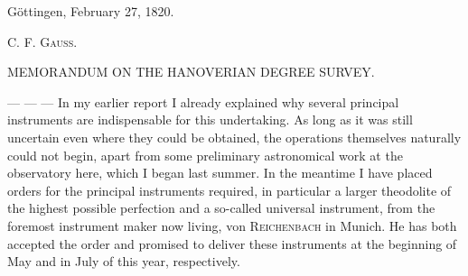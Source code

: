 Göttingen, February 27, 1820.
\begin{flushright}C. F. \textsc{Gauss}.\end{flushright}

\par\bigskip{}
\begin{center}\large MEMORANDUM ON THE HANOVERIAN DEGREE SURVEY.\end{center}
\par
— — — In my earlier report I already explained why several principal instruments are indispensable for this undertaking. As long as it was still uncertain even where they could be obtained, the operations themselves naturally could not begin, apart from some preliminary astronomical work at the observatory here, which I began last summer. In the meantime I have placed orders for the principal instruments required, in particular a larger theodolite of the highest possible perfection and a so-called universal instrument, from the foremost instrument maker now living, von \textsc{Reichenbach} in Munich. He has both accepted the order and promised to deliver these instruments at the beginning of May and in July of this year, respectively.
